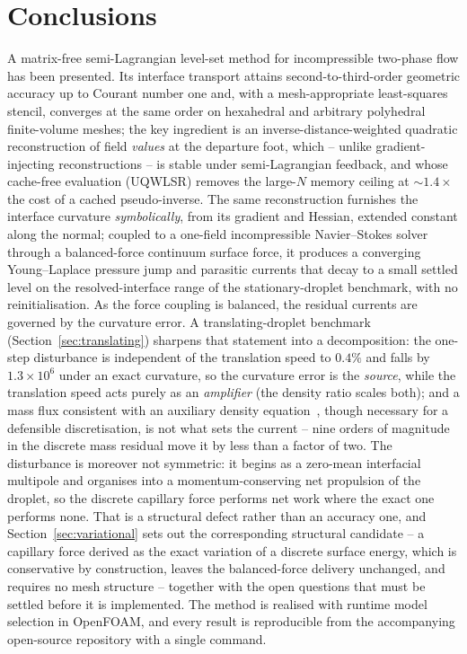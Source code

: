 \documentclass[preprint,3p,11pt]{elsarticle}
\begin{document}
\section{Conclusions}
\label{sec:conclusions}
A matrix-free semi-Lagrangian level-set method for incompressible two-phase flow has been
presented. Its interface transport attains second-to-third-order geometric accuracy up to
Courant number one and, with a mesh-appropriate least-squares stencil, converges at the
same order on hexahedral and arbitrary polyhedral finite-volume meshes; the key ingredient
is an inverse-distance-weighted quadratic reconstruction of field \emph{values} at the
departure foot, which -- unlike gradient-injecting reconstructions -- is stable under
semi-Lagrangian feedback, and whose cache-free evaluation (UQWLSR) removes the large-$N$
memory ceiling at $\sim\!1.4\times$ the cost of a cached pseudo-inverse. The same
reconstruction furnishes the interface curvature \emph{symbolically}, from its gradient and
Hessian, extended constant along the normal; coupled to a one-field incompressible
Navier--Stokes solver through a balanced-force continuum surface force, it produces a
converging Young--Laplace pressure jump and parasitic currents that decay to a small settled
level on the resolved-interface range of the stationary-droplet benchmark, with no
reinitialisation. As the force coupling is balanced, the residual currents are governed by
the curvature error. A translating-droplet benchmark (Section~\ref{sec:translating})
sharpens that statement into a decomposition: the one-step disturbance is independent of the
translation speed to $0.4\%$ and falls by $1.3\times10^{6}$ under an exact curvature, so the
curvature error is the \emph{source}, while the translation speed acts purely as an
\emph{amplifier} (the density ratio scales both); and a mass flux consistent with an auxiliary density
equation~\cite{liu2023}, though necessary for a defensible discretisation, is not what sets
the current -- nine orders of magnitude in the discrete mass residual move it by less than a
factor of two. The disturbance is moreover not symmetric: it begins as a zero-mean
interfacial multipole and organises into a momentum-conserving net propulsion of the
droplet, so the discrete capillary force performs net work where the exact one performs
none. That is a structural defect rather than an accuracy one, and
Section~\ref{sec:variational} sets out the corresponding structural candidate -- a capillary
force derived as the exact variation of a discrete surface energy, which is conservative by
construction, leaves the balanced-force delivery unchanged, and requires no mesh structure --
together with the open questions that must be settled before it is implemented. The method is realised with runtime
model selection in OpenFOAM, and every result is reproducible from the accompanying
open-source repository with a single command.
\end{document}
